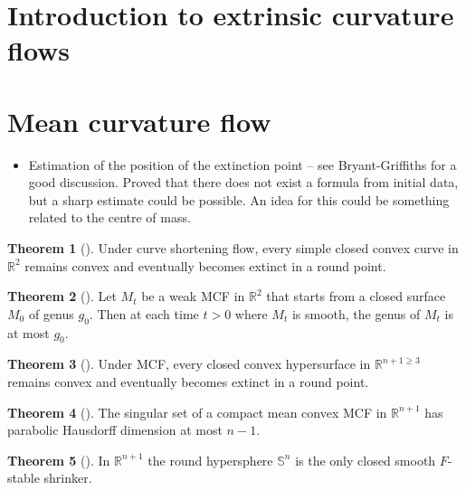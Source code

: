 \documentclass{amsart}
\theoremstyle{definition}
\newtheorem{Thm}{Theorem}[section]
\begin{document}
\section{Introduction to extrinsic curvature flows}
  
\newpage 

\section{Mean curvature flow}
\begin{refsection}

\begin{itemize}
\item Estimation of the position of the extinction point -- see Bryant-Griffiths for a good discussion. Proved that there does not exist a formula from initial data, but a sharp estimate could be possible. An idea for this could be something related to the centre of mass.
\end{itemize}

\begin{Thm}[\cite{GageHamilton1986}]
Under curve shortening flow, every simple closed convex curve in ${\mathbb{R}}^{2}$ remains convex and eventually becomes extinct in a round point.
\end{Thm}

\begin{Thm}[\cite{White1995}]
Let ${M}_{t}$ be a weak MCF in ${\mathbb{R}}^{2}$ that starts from a closed surface ${M}_{0}$ of genus $g_0$. Then at each time $t > 0$ where ${M}_{t}$ is smooth, the genus of  ${M}_{t}$ is at most $g_0$.
\end{Thm}

\begin{Thm}[\cite{Huisken1984}]
Under MCF, every closed convex hypersurface in ${\mathbb{R}}^{n+1 \geq 3}$ remains convex and eventually becomes extinct in a round point.
\end{Thm}
 
\begin{Thm}[\cite{White2000}]
The singular set of a compact mean convex MCF in ${\mathbb{R}}^{n+1}$ has parabolic Hausdorff dimension at most $n-1$.
\end{Thm}

\begin{Thm}[\cite{ColdingMinicozzi2012}]
In ${\mathbb{R}}^{n+1}$ the round hypersphere ${\mathbb{S}}^{n}$ is the only closed smooth $F$-stable shrinker.
\end{Thm}


\end{refsection}
\end{document}
